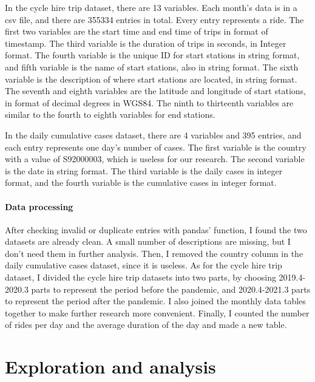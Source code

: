\documentclass[11pt,a4paper]{article}
\begin{document}
In the cycle hire trip dataset, there are 13 variables. Each month’s data is in a csv file, and there are 355334 entries in total. Every entry represents a ride. The first two variables are the start time and end time of trips in format of timestamp. The third variable is the duration of trips in seconds, in Integer format. The fourth variable is the unique ID for start stations in string format, and fifth variable is the name of start stations, also in string format. The sixth variable is the description of where start stations are located, in string format. The seventh and eighth variables are the latitude and longitude of start stations, in format of decimal degrees in WGS84. The ninth to thirteenth variables are similar to the fourth to eighth variables for end stations. 

In the daily cumulative cases dataset, there are 4 variables and 395 entries, and each entry represents one day’s number of cases. The first variable is the country with a value of S92000003, which is useless for our research. The second variable is the date in string format. The third variable is the daily cases in integer format, and the fourth variable is the cumulative cases in integer format. 


\paragraph{Data processing}%

After checking invalid or duplicate entries with pandas’ function, I found the two datasets are already clean. A small number of descriptions are missing, but I don’t need them in further analysis. Then, I removed the country column in the daily cumulative cases dataset, since it is useless. As for the cycle hire trip dataset, I divided the cycle hire trip datasets into two parts, by choosing 2019.4-2020.3 parts to represent the period before the pandemic, and 2020.4-2021.3 parts to represent the period after the pandemic. I also joined the monthly data tables together to make further research more convenient. Finally, I counted the number of rides per day and the average duration of the day and made a new table.

\section{Exploration and  analysis}
\end{document}
